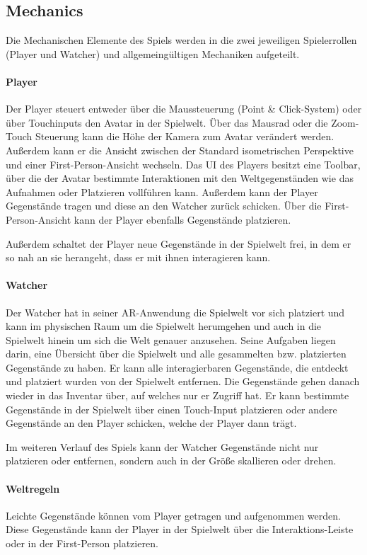 \subsection{Mechanics}
Die Mechanischen Elemente des Spiels werden in die zwei jeweiligen Spielerrollen (Player und Watcher) und allgemeingültigen Mechaniken aufgeteilt.

\paragraph{Player}
Der Player steuert entweder über die Maussteuerung (Point \& Click-System) oder über Touchinputs den Avatar in der Spielwelt. Über das Mausrad oder die Zoom-Touch Steuerung kann die Höhe der Kamera zum Avatar verändert werden. Außerdem kann er die Ansicht zwischen der Standard isometrischen Perspektive und einer First-Person-Ansicht wechseln. Das \ac{UI} des Players besitzt eine Toolbar, über die der Avatar bestimmte Interaktionen mit den Weltgegenständen wie das Aufnahmen oder Platzieren vollführen kann. Außerdem kann der Player Gegenstände tragen und diese an den Watcher zurück schicken. Über die First-Person-Ansicht kann der Player ebenfalls Gegenstände platzieren.

Außerdem schaltet der Player neue Gegenstände in der Spielwelt frei, in dem er so nah an sie herangeht, dass er mit ihnen interagieren kann.

\paragraph{Watcher}
Der Watcher hat in seiner \ac{AR}-Anwendung die Spielwelt vor sich platziert und kann im physischen Raum um die Spielwelt herumgehen und auch in die Spielwelt hinein um sich die Welt genauer anzusehen. Seine Aufgaben liegen darin, eine Übersicht über die Spielwelt und alle gesammelten bzw. platzierten Gegenstände zu haben. Er kann alle interagierbaren Gegenstände, die entdeckt und platziert wurden von der Spielwelt entfernen. Die Gegenstände gehen danach wieder in das Inventar über, auf welches nur er Zugriff hat. Er kann bestimmte Gegenstände in der Spielwelt über einen Touch-Input platzieren oder andere Gegenstände an den Player schicken, welche der Player dann trägt. 

Im weiteren Verlauf des Spiels kann der Watcher Gegenstände nicht nur platzieren oder entfernen, sondern auch in der Größe skallieren oder drehen.

\paragraph{Weltregeln}
Leichte Gegenstände können vom Player getragen und aufgenommen werden. Diese Gegenstände kann der Player in der Spielwelt über die Interaktions-Leiste oder in der First-Person platzieren. 

